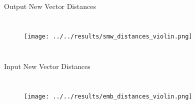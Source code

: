 \documentclass{beamer}
\begin{document}
\begin{frame}[allowframebreaks]

{\tiny }
\end{frame}

\appendix
\begin{frame}{Output New Vector Distances}
  \begin{columns}
    \column{\dimexpr\paperwidth}
    \begin{figure}
    \texttt{[image: ../../results/smw\_distances\_violin.png]}
    \end{figure}
  \end{columns}
\begin{figure}
\end{figure}
\end{frame}


\begin{frame}{Input New Vector Distances}
  \begin{columns}
    \column{\dimexpr\paperwidth}
    \begin{figure}
    \texttt{[image: ../../results/emb\_distances\_violin.png]}
    \end{figure}
  \end{columns}
\begin{figure}
\end{figure}
\end{frame}
\end{document}
